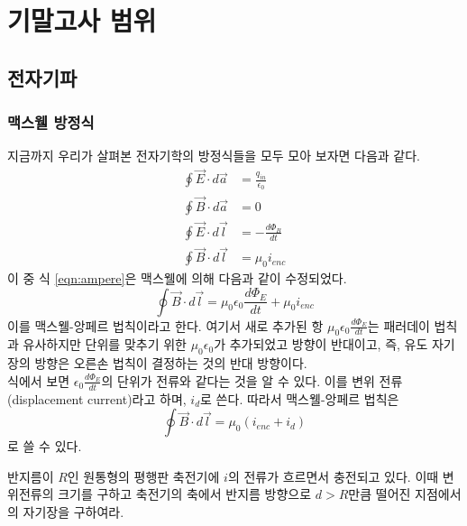 
\part{기말고사 범위}



\chapter{전자기파}
\section{맥스웰 방정식}
지금까지 우리가 살펴본 전자기학의 방정식들을 모두 모아 보자면 다음과 같다.
\begin{align}
\oint \vec{E}\cdot d\vec{a}&=\frac{q_{in}}{\epsilon_0}\\
\oint \vec{B}\cdot d\vec{a}&=0\\
\oint \vec{E}\cdot d\vec{l}&=-\frac{d\Phi_B}{dt}\\
\oint \vec{B}\cdot d\vec{l}&=\mu_0 i_{enc}\label{eqn:ampere}
\end{align}
이 중 식 \ref{eqn:ampere}은 맥스웰에 의해 다음과 같이 수정되었다.
\begin{equation}
\oint \vec{B}\cdot d\vec{l}=\mu_0\epsilon_0 \frac{d\Phi_E}{dt}+\mu_0 i_{enc}
\end{equation}
이를 맥스웰-앙페르 법칙이라고 한다. 여기서 새로 추가된 항 $\mu_0\epsilon_0 \frac{d\Phi_E}{dt}$는 패러데이 법칙과 유사하지만 단위를 맞추기 위한 $\mu_0\epsilon_0$가 추가되었고 방향이 반대이고, 즉, 유도 자기장의 방향은 오른손 법칙이 결정하는 것의 반대 방향이다. \\
식에서 보면 $\epsilon_0 \frac{d\Phi_E}{dt}$의 단위가 전류와 같다는 것을 알 수 있다. 이를 변위 전류(displacement current)라고 하며, $i_d$로 쓴다. 따라서 맥스웰-앙페르 법칙은 
\begin{equation}
\oint \vec{B}\cdot d\vec{l}=\mu_0(i_{enc}+i_d)
\end{equation}
로 쓸 수 있다. 
\begin{example}\label{dispcur}
반지름이 $R$인 원통형의 평행판 축전기에 $i$의 전류가 흐르면서 충전되고 있다. 이때 변위전류의 크기를 구하고 축전기의 축에서 반지름 방향으로 $d>R$만큼 떨어진 지점에서의 자기장을 구하여라.
\end{example}
